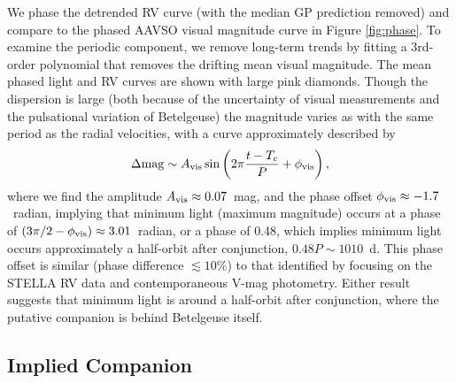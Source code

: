 \documentclass[twocolumn]{aastex631}
\begin{document}
We phase the detrended RV curve (with the median GP prediction removed) and compare to the phased AAVSO visual magnitude curve in Figure \ref{fig:phase}.  
To examine the periodic component, we remove long-term trends by fitting a 3rd-order polynomial that removes the drifting mean visual magnitude.  The mean phased light and RV curves are shown with large pink diamonds.  Though the dispersion is large (both because of the uncertainty of visual measurements and the pulsational variation of Betelgeuse) the magnitude varies as with the same period as the radial velocities, with a curve approximately described by 
\begin{equation}\label{Magformula}
    \Delta {\rm mag} \sim A_{\rm vis} \sin \left( 2 \pi \frac{t-T_c }{P} + \phi_{\rm vis} \right)  , 
\end{equation}
where we find the amplitude $A_{\rm vis}\approx  0.07$~mag, and the phase offset $\phi_{\rm vis}\approx -1.7$~radian, implying that minimum light (maximum magnitude) occurs at a phase of $(3\pi/2 - \phi_{\rm vis}) \approx 3.01$~radian, or a phase of 0.48, which implies minimum light occurs approximately a half-orbit after conjunction,  $ 0.48 P \sim 1010$~d. This phase offset is similar (phase difference $\lesssim10$\%) to that identified by \citet{2024arXiv240809089G} focusing on the STELLA RV data and contemporaneous V-mag photometry. Either result suggests that minimum light is around a half-orbit after conjunction, where the putative companion is behind Betelgeuse itself.

\subsection{Implied Companion}
\end{document}
